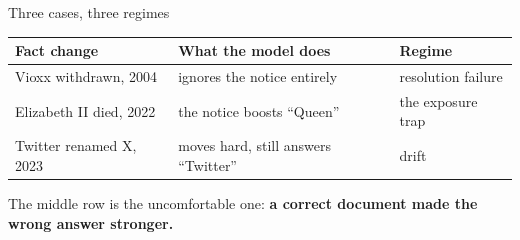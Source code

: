 \documentclass[aspectratio=169]{beamer}
\begin{document}
\begin{frame}{Three cases, three regimes}
  \vspace{0.2cm}
  \begin{center}
  \small
  \begin{tabular}{@{}lll@{}}
    \toprule
    \textbf{Fact change} & \textbf{What the model does} & \textbf{Regime} \\
    \midrule
    Vioxx withdrawn, 2004      & ignores the notice entirely          & \textcolor{update}{resolution failure} \\[3pt]
    Elizabeth II died, 2022    & the notice boosts ``Queen''          & \textcolor{retrieve}{the exposure trap} \\[3pt]
    Twitter renamed X, 2023    & moves hard, still answers ``Twitter'' & \textcolor{store}{drift} \\
    \bottomrule
  \end{tabular}
  \end{center}
  \vspace{1.1em}
  \begin{center}
    The middle row is the uncomfortable one: \textbf{a correct document made the wrong answer stronger.}
  \end{center}
\end{frame}
\end{document}
